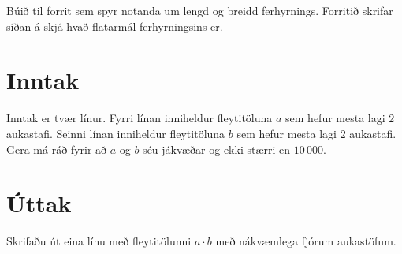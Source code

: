 
Búið til forrit sem spyr notanda um lengd og breidd ferhyrnings. Forritið
skrifar síðan á skjá hvað flatarmál ferhyrningsins er.

\section*{Inntak}
Inntak er tvær línur.
Fyrri línan inniheldur fleytitöluna $a$ sem hefur mesta lagi $2$ aukastafi.
Seinni línan inniheldur fleytitöluna $b$ sem hefur mesta lagi $2$ aukastafi.
Gera má ráð fyrir að $a$ og $b$ séu jákvæðar og ekki stærri en $10\,000$.

\section*{Úttak}
Skrifaðu út eina línu með fleytitölunni $a \cdot b$ með nákvæmlega fjórum aukastöfum.
